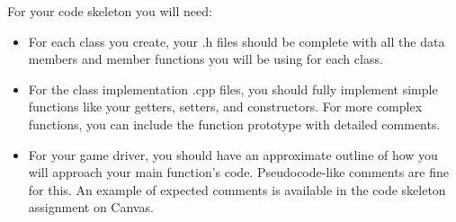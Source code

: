 For your code skeleton you will need:

\begin{itemize}
    \item For each class you create, your .h files should be complete with all the data members and member functions you will be using for each class. 
    \item For the class implementation .cpp files, you should fully implement simple functions like your getters, setters, and constructors. For more complex functions, you can include the function prototype with detailed comments.
    \item For your game driver, you should have an approximate outline of how you will approach your main function's code. Pseudocode-like comments are fine for this. An example of expected comments is available in the code skeleton assignment on Canvas.
\end{itemize}
